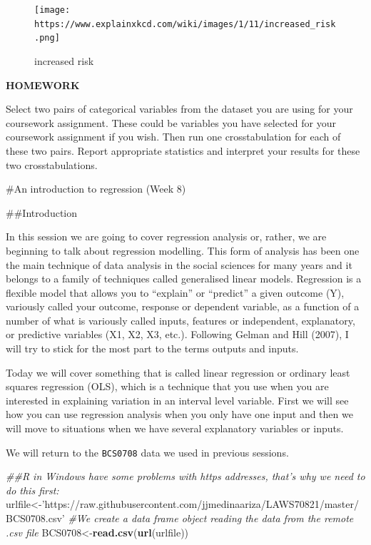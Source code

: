 \documentclass[]{book}
\newenvironment{Shaded}{\begin{snugshade}}{\end{snugshade}}
\newcommand{\CommentTok}[1]{\textcolor[rgb]{0.56,0.35,0.01}{\textit{#1}}}
\newcommand{\KeywordTok}[1]{\textcolor[rgb]{0.13,0.29,0.53}{\textbf{#1}}}
\newcommand{\NormalTok}[1]{#1}
\newcommand{\StringTok}[1]{\textcolor[rgb]{0.31,0.60,0.02}{#1}}
\theoremstyle{definition}
\theoremstyle{definition}
\theoremstyle{definition}
\theoremstyle{remark}
\begin{document}
\begin{figure}
\centering
\texttt{[image: https://www.explainxkcd.com/wiki/images/1/11/increased\_risk.png]}
\caption{increased risk}
\end{figure}

\textbf{HOMEWORK}

Select two pairs of categorical variables from the dataset you are using
for your coursework assignment. These could be variables you have
selected for your coursework assignment if you wish. Then run one
crosstabulation for each of these two pairs. Report appropriate
statistics and interpret your results for these two crosstabulations.

\#An introduction to regression (Week 8)

\#\#Introduction

In this session we are going to cover regression analysis or, rather, we
are beginning to talk about regression modelling. This form of analysis
has been one the main technique of data analysis in the social sciences
for many years and it belongs to a family of techniques called
generalised linear models. Regression is a flexible model that allows
you to ``explain'' or ``predict'' a given outcome (Y), variously called
your outcome, response or dependent variable, as a function of a number
of what is variously called inputs, features or independent,
explanatory, or predictive variables (X1, X2, X3, etc.). Following
Gelman and Hill (2007), I will try to stick for the most part to the
terms outputs and inputs.

Today we will cover something that is called linear regression or
ordinary least squares regression (OLS), which is a technique that you
use when you are interested in explaining variation in an interval level
variable. First we will see how you can use regression analysis when you
only have one input and then we will move to situations when we have
several explanatory variables or inputs.

We will return to the \texttt{BCS0708} data we used in previous
sessions.

\begin{Shaded}
\begin{Highlighting}[]
\CommentTok{##R in Windows have some problems with https addresses, that's why we need to do this first:}
\NormalTok{urlfile<-}\StringTok{'https://raw.githubusercontent.com/jjmedinaariza/LAWS70821/master/BCS0708.csv'}
\CommentTok{#We create a data frame object reading the data from the remote .csv file}
\NormalTok{BCS0708<-}\KeywordTok{read.csv}\NormalTok{(}\KeywordTok{url}\NormalTok{(urlfile))}
\end{Highlighting}
\end{Shaded}
\end{document}
